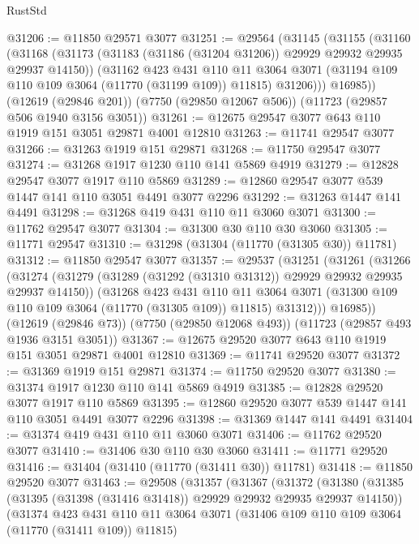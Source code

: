 \begin{lexlean}{RustStd}
\begin{coremodule}
@31206 := @11850 @29571 @3077
@31251 := @29564
    (@31145
      (@31155
        (@31160
          (@31168
            (@31173 (@31183 (@31186 (@31204 @31206)) @29929 @29932 @29935 @29937 @14150))
            (@31162
              @423
              @431
              @110
              @11
              @3064
              @3071
              (@31194 @109 @110 @109 @3064 (@11770 (@31199 @109)) @11815)
              @31206)))
        @16985))
    (@12619 (@29846 @201))
    (@7750 (@29850 @12067 @506))
    (@11723 (@29857 @506 @1940 @3156 @3051))
@31261 := @12675 @29547 @3077 @643 @110 @1919 @151 @3051 @29871 @4001 @12810
@31263 := @11741 @29547 @3077
@31266 := @31263 @1919 @151 @29871
@31268 := @11750 @29547 @3077
@31274 := @31268 @1917 @1230 @110 @141 @5869 @4919
@31279 := @12828 @29547 @3077 @1917 @110 @5869
@31289 := @12860 @29547 @3077 @539 @1447 @141 @110 @3051 @4491 @3077 @2296
@31292 := @31263 @1447 @141 @4491
@31298 := @31268 @419 @431 @110 @11 @3060 @3071
@31300 := @11762 @29547 @3077
@31304 := @31300 @30 @110 @30 @3060
@31305 := @11771 @29547
@31310 := @31298 (@31304 (@11770 (@31305 @30)) @11781)
@31312 := @11850 @29547 @3077
@31357 := @29537
    (@31251
      (@31261
        (@31266
          (@31274
            (@31279 (@31289 (@31292 (@31310 @31312)) @29929 @29932 @29935 @29937 @14150))
            (@31268
              @423
              @431
              @110
              @11
              @3064
              @3071
              (@31300 @109 @110 @109 @3064 (@11770 (@31305 @109)) @11815)
              @31312)))
        @16985))
    (@12619 (@29846 @73))
    (@7750 (@29850 @12068 @493))
    (@11723 (@29857 @493 @1936 @3151 @3051))
@31367 := @12675 @29520 @3077 @643 @110 @1919 @151 @3051 @29871 @4001 @12810
@31369 := @11741 @29520 @3077
@31372 := @31369 @1919 @151 @29871
@31374 := @11750 @29520 @3077
@31380 := @31374 @1917 @1230 @110 @141 @5869 @4919
@31385 := @12828 @29520 @3077 @1917 @110 @5869
@31395 := @12860 @29520 @3077 @539 @1447 @141 @110 @3051 @4491 @3077 @2296
@31398 := @31369 @1447 @141 @4491
@31404 := @31374 @419 @431 @110 @11 @3060 @3071
@31406 := @11762 @29520 @3077
@31410 := @31406 @30 @110 @30 @3060
@31411 := @11771 @29520
@31416 := @31404 (@31410 (@11770 (@31411 @30)) @11781)
@31418 := @11850 @29520 @3077
@31463 := @29508
    (@31357
      (@31367
        (@31372
          (@31380
            (@31385 (@31395 (@31398 (@31416 @31418)) @29929 @29932 @29935 @29937 @14150))
            (@31374
              @423
              @431
              @110
              @11
              @3064
              @3071
              (@31406 @109 @110 @109 @3064 (@11770 (@31411 @109)) @11815)

\end{coremodule}
\end{lexlean}
